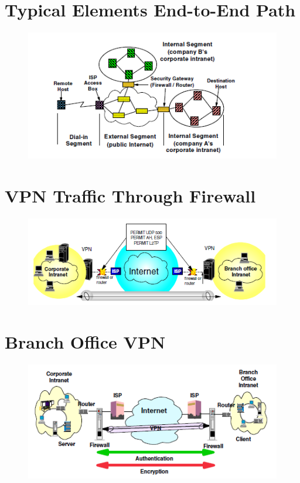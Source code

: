 \documentclass[10pt,a4paper]{article}
\author{Austin Vern Songer}
\begin{document}
\tableofcontents
\newpage

\section{Typical Elements End-to-End Path}

\begin{figure}[hbtp]
\centering
\includegraphics[scale=1]{TypicalElementsEnd-To-End-Path.png}
\end{figure}

\newpage
\section{VPN Traffic Through Firewall}

\begin{figure}[hbtp]
\centering
\includegraphics[scale=1]{VPN-Traffic-Through-FireWall.png}
\end{figure}

\newpage
\section{Branch Office VPN}

\begin{figure}[hbtp]
\centering
\includegraphics[scale=1]{Branch Office VPN.png}
\end{figure}
\end{document}
